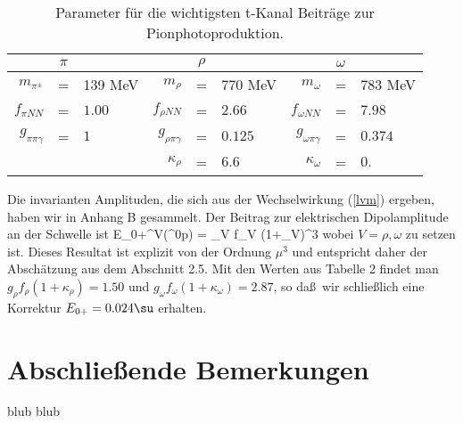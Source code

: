 \begin{table}
\caption{Parameter f\"ur die wichtigsten t-Kanal Beitr\"age 
zur Pionphotoproduktion.}
\begin{center}
\begin{tabular}{|rcl|rcl|rcl|}\hline
   & $\pi$ &             &  & $\rho$ &             &    &  $\omega$ &  \\ 
                                                                \hline\hline
$m_{\pi^\pm}$&=&139 MeV  & $m_\rho$&=&$770$ MeV    &  $m_\omega$&=&$783$ MeV\\
$f_{\pi NN}$&=&$1.00$    &  $f_{\rho NN}$&=&$2.66$ & $f_{\omega NN}$&=&$7.98$\\
$g_{\pi\pi\gamma}$&=&$1$ &  $g_{\rho\pi\gamma}$&=&$0.125$ 
                                        &   $g_{\omega\pi\gamma}$&=&$0.374$  \\
    & &       &  $\kappa_\rho$&=&$6.6$  &   $\kappa_\omega$&=&$0.$   \\ \hline
\end{tabular}
\end{center}
\end{table}                    

Die invarianten Amplituden, die sich aus der Wechselwirkung (\ref{lvm})
ergeben, haben wir in Anhang B gesammelt. Der Beitrag zur
elektrischen Dipolamplitude an der Schwelle ist
\be
  E_{0+}^V(\pi^0p) =  \sum_V 
    f_V (1+\kappa_V)\mu^3
\ee     	 
wobei $V=\rho,\omega$ zu setzen ist. Dieses Resultat ist explizit
von der Ordnung $\mu^3$ und entspricht daher der Absch\"atzung
aus dem Abschnitt 2.5. Mit den Werten aus Tabelle 2 findet man 
$g_\rho f_\rho (1+\kappa_\rho)=1.50$ und  $g_\omega f_\omega 
(1+\kappa_\omega)=2.87$, so da\ss\ wir schlie\ss lich eine 
Korrektur $E_{0+}=0.024\su$ erhalten.   


 
\section{Abschlie\ss ende Bemerkungen}
blub blub
